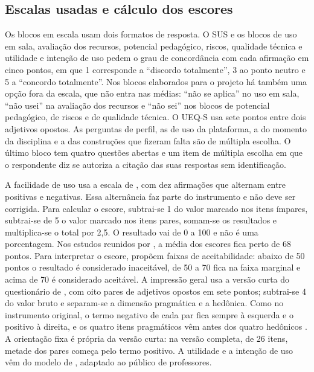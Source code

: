 \subsection{Escalas usadas e cálculo dos escores}
\label{subsec:escalas-escores}

Os blocos em escala usam dois formatos de resposta. O SUS e os blocos de uso em sala, avaliação dos recursos, potencial pedagógico, riscos, qualidade técnica e utilidade e intenção de uso pedem o grau de concordância com cada afirmação em cinco pontos, em que 1 corresponde a ``discordo totalmente'', 3 ao ponto neutro e 5 a ``concordo totalmente''. Nos blocos elaborados para o projeto há também uma opção fora da escala, que não entra nas médias: ``não se aplica'' no uso em sala, ``não usei'' na avaliação dos recursos e ``não sei'' nos blocos de potencial pedagógico, de riscos e de qualidade técnica. O UEQ-S usa sete pontos entre dois adjetivos opostos. As perguntas de perfil, as de uso da plataforma, a do momento da disciplina e a das construções que fizeram falta são de múltipla escolha. O último bloco tem quatro questões abertas e um item de múltipla escolha em que o respondente diz se autoriza a citação das suas respostas sem identificação.

A facilidade de uso usa a escala de , com dez afirmações que alternam entre positivas e negativas. Essa alternância faz parte do instrumento e não deve ser corrigida. Para calcular o escore, subtrai-se 1 do valor marcado nos itens ímpares, subtrai-se de 5 o valor marcado nos itens pares, somam-se os resultados e multiplica-se o total por 2,5. O resultado vai de 0 a 100 e não é uma porcentagem. Nos estudos reunidos por , a média dos escores fica perto de 68 pontos. Para interpretar o escore,  propõem faixas de aceitabilidade: abaixo de 50 pontos o resultado é considerado inaceitável, de 50 a 70 fica na faixa marginal e acima de 70 é considerado aceitável. A impressão geral usa a versão curta do questionário de , com oito pares de adjetivos opostos em sete pontos; subtrai-se 4 do valor bruto e separam-se a dimensão pragmática e a hedônica. Como no instrumento original, o termo negativo de cada par fica sempre à esquerda e o positivo à direita, e os quatro itens pragmáticos vêm antes dos quatro hedônicos \cite{schrepp2023handbook}. A orientação fixa é própria da versão curta: na versão completa, de 26 itens, metade dos pares começa pelo termo positivo. A utilidade e a intenção de uso vêm do modelo de , adaptado ao público de professores.

